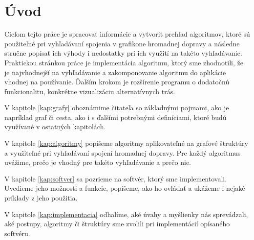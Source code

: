 \chapter*{Úvod} %

Cieľom tejto práce je spracovať informácie a vytvoriť prehľad algoritmov, ktoré sú použiteľné pri vyhľadávaní spojenia v grafikone hromadnej dopravy a následne stručne popísať ich výhody i nedostatky pri ich využití na takéto vyhľadávanie. Praktickou stránkou práce je implementácia algoritmu, ktorý sme zhodnotili, že je najvhodnejší na vyhľadávanie a zakomponovanie algoritmu do aplikácie vhodnej na používanie. Ďalším krokom je rozšírenie programu o dodatočnú funkcionalitu, konkrétne vizualizáciu alternatívnych trás.

V kapitole \ref{kap:grafy} oboznámime čitateľa so základnými pojmami, ako je napríklad graf či cesta, ako i s ďalšími potrebnými definíciami, ktoré budú využívané v ostatných kapitolách.

V kapitole \ref{kap:algoritmy} popíšeme algoritmy aplikovateľné na grafové štruktúry a využiteľné pri vyhľadávaní spojení hromadnej dopravy. Pre každý algoritmus uvážime, prečo je vhodný pre takéto vyhľadávanie a prečo nie.

V kapitole \ref{kap:softver} sa pozrieme na softvér, ktorý sme implementovali. Uvedieme jeho možnosti a funkcie, popíšeme, ako ho ovládať a ukážeme i nejaké príklady z jeho použitia.

V kapitole \ref{kap:implementacia} odhalíme, aké úvahy a myšlienky nás sprevádzali, aké postupy, algoritmy či štruktúry sme zvolili pri implementácií opísaného softvéru.